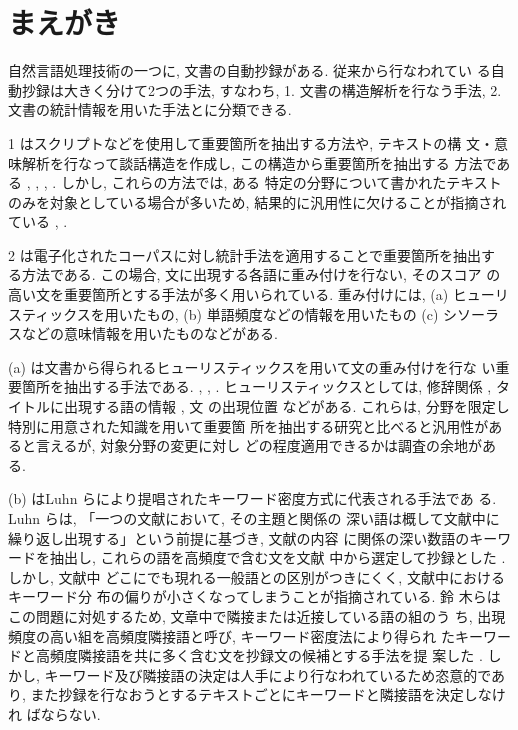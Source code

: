 \section{まえがき}

自然言語処理技術の一つに, 文書の自動抄録がある.  従来から行なわれてい
る自動抄録は大きく分けて2つの手法, すなわち, 1. 文書の構造解析を行なう手法, 2. 文書の統計情報を用いた手法とに分類できる.

1 はスクリプトなどを使用して重要箇所を抽出する方法や, テキストの構
文・意味解析を行なって談話構造を作成し, この構造から重要箇所を抽出する
方法である \cite{Reimer1988}, \cite{Tamura1989}, \cite{Jacobs1990},
\cite{Inagaki1991}.  しかし, これらの方法では, ある
特定の分野について書かれたテキストのみを対象としている場合が多いため, 
結果的に汎用性に欠けることが指摘されている \cite{Paice1990},
\cite{Zechner1996}.

2 は電子化されたコーパスに対し統計手法を適用することで重要箇所を抽出す
る方法である.  この場合, 文に出現する各語に重み付けを行ない, そのスコア
の高い文を重要箇所とする手法が多く用いられている.  重み付けには, (a) 
ヒューリスティックスを用いたもの, (b) 単語頻度などの情報を用いたもの 
(c) シソーラスなどの意味情報を用いたものなどがある.

(a) は文書から得られるヒューリスティックスを用いて文の重み付けを行な
い重要箇所を抽出する手法である. \cite{Paice1990}, \cite{Paice1993},
\cite{Kupiec1995}.  ヒューリスティックスとしては, 修辞関係 
\cite{Miike1994}, タイトルに出現する語の情報 \cite{Edmundson1969}, 文
の出現位置
\cite{Baxendale1958}などがある.  これらは, 分野を限定し特別に用意された知識を用いて重要箇
所を抽出する研究と比べると汎用性があると言えるが, 対象分野の変更に対し
どの程度適用できるかは調査の余地がある.

(b) はLuhn らにより提唱されたキーワード密度方式に代表される手法であ
る\cite{Luhn1958}.  Luhn らは, 「一つの文献において, その主題と関係の
深い語は概して文献中に繰り返し出現する」という前提に基づき, 文献の内容
に関係の深い数語のキーワードを抽出し, これらの語を高頻度で含む文を文献
中から選定して抄録とした \cite{Luhn1958}.  しかし, 文献中
どこにでも現れる一般語との区別がつきにくく, 文献中におけるキーワード分
布の偏りが小さくなってしまうことが指摘されている\cite{Suzuki1988}.  鈴
木らはこの問題に対処するため, 文章中で隣接または近接している語の組のう
ち, 出現頻度の高い組を高頻度隣接語と呼び, キーワード密度法により得られ
たキーワードと高頻度隣接語を共に多く含む文を抄録文の候補とする手法を提
案した
\cite{Suzuki1988}.  しかし, キーワード及び隣接語の決定は人手により行なわれているため恣意的であり, 
また抄録を行なおうとするテキストごとにキーワードと隣接語を決定しなけれ
ばならない.


